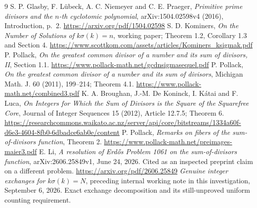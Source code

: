 \documentclass[11pt]{article}
\begin{document}
\begin{thebibliography}{9}
 S. P. Glasby, F. L\"ubeck, A. C. Niemeyer and C. E. Praeger, \emph{Primitive prime divisors and the $n$-th cyclotomic polynomial}, arXiv:1504.02598v4 (2016), Introduction, p.~2.\newline
\url{https://arxiv.org/pdf/1504.02598}
 S. D. Kominers, \emph{On the Number of Solutions of $k\sigma(k)=n$}, working paper; Theorem 1.2, Corollary 1.3 and Section 4.\newline
\url{https://www.scottkom.com/assets/articles/Kominers_ksigmak.pdf}
 P. Pollack, \emph{On the greatest common divisor of a number and its sum of divisors, II}, Section 1.1.\newline
\url{https://www.pollack-math.net/gcdnsigmasequel.pdf}
 P. Pollack, \emph{On the greatest common divisor of a number and its sum of divisors}, Michigan Math. J. 60 (2011), 199--214; Theorem 4.1.\newline
\url{https://www.pollack-math.net/combined3.pdf}
 K. A. Broughan, J.-M. De Koninck, I. K\'atai and F. Luca, \emph{On Integers for Which the Sum of Divisors is the Square of the Squarefree Core}, Journal of Integer Sequences 15 (2012), Article 12.7.5; Theorem 6.\newline
\url{https://researchcommons.waikato.ac.nz/server/api/core/bitstreams/1334a60f-d6e3-4604-8fb0-6dbadce6ab0e/content}
 P. Pollack, \emph{Remarks on fibers of the sum-of-divisors function}, Theorem 2.\newline
\url{https://www.pollack-math.net/preimages-maier3.pdf}
 E. Li, \emph{A resolution of Erd\H{o}s Problem 1061 on the sum-of-divisors function}, arXiv:2606.25849v1, June 24, 2026. Cited as an inspected preprint claim on a different problem.\newline
\url{https://arxiv.org/pdf/2606.25849}
 \emph{Genuine integer exchanges for $k\sigma(k)=N$}, preceding internal working note in this investigation, September 6, 2026. Exact exchange decomposition and its still-unproved uniform counting requirement.
\end{thebibliography}
\end{document}
